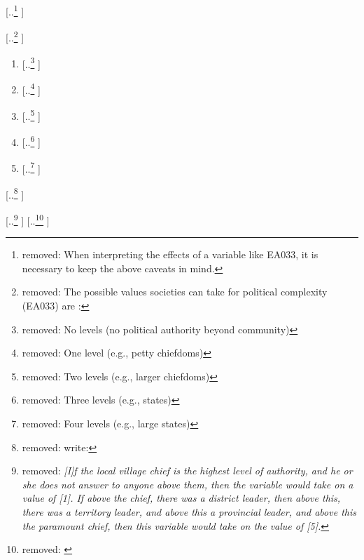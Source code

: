 \documentclass[unnumsec,webpdf,modern,medium]{oup-authoring-template}
\providecommand{\DIFdeltex}[1]{{\protect\color{red} [..\footnote{removed: #1} ]}} %
\providecommand{\DIFdel}[1]{\texorpdfstring{\DIFdeltex{#1}}{}} %
\begin{document}
\DIFdel{When interpreting the effects of a variable like EA033, it is necessary to keep the above caveats in mind.
}%

\DIFdel{The possible values societies can take for political complexity (EA033) are :
}%

\begin{enumerate}%
\item%
\DIFdel{No levels (no political authority beyond community)
}%
\item%
\DIFdel{One level (e.g., petty chiefdoms)}%
\item%
\DIFdel{Two levels (e.g., larger chiefdoms)
}%
\item%
\DIFdel{Three levels (e.g., states) 
}%
\item%
\DIFdel{Four levels (e.g., large states)}
\end{enumerate}%

\DIFdel{\citet{giuliano2018ancestral} write: 
}%

\DIFdel{\emph{[I]f the local village chief is the highest level of authority, and he or she does not answer to anyone above them, then the variable would take on a value of [1]. If above the chief, there was a district leader, then above this, there was a territory leader, and above this a provincial leader, and above this the paramount chief, then this variable would take on the value of [5].} 
}%
\DIFdel{\citet[9]{giuliano2018ancestral}
}%
\end{document}
